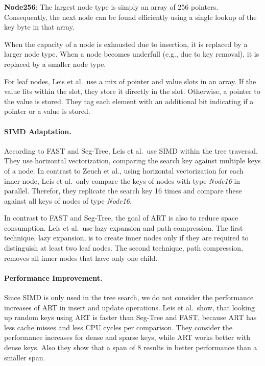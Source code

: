 \documentclass[runningheads,a4paper]{llncs}
\begin{document}
\textbf{Node256}: The largest node type is simply an array of 256 pointers. Consequently, the next node can be found efficiently using a single lookup of the key byte in that array. 

\noindent When the capacity of a node is exhausted due to insertion, it is replaced by a larger node type. When a node becomes underfull (e.g., due to key removal), it is replaced by a smaller node type.

For leaf nodes, Leis et al.\ use a mix of pointer and value slots in an array. If the value fits within the slot, they store it directly in the slot. Otherwise, a pointer to the value is stored. They tag each element with an additional bit indicating if a pointer or a value is stored.


\paragraph{SIMD Adaptation.}
According to FAST and Seg-Tree, Leis et al.\ use SIMD within the tree traversal. They use horizontal vectorization, comparing the search key against multiple keys of a node. In contrast to Zeuch et al., using horizontal vectorization for each inner node, Leis et al.\ only compare the keys of nodes with type \emph{Node16} in parallel. Therefor, they replicate the search key 16 times and compare these against all keys of nodes of type \emph{Node16}.

In contrast to FAST and Seg-Tree, the goal of ART is also to reduce space consumption. Leis et al.\ use lazy expansion and path compression. The first technique, lazy expansion, is to create inner nodes only if they are required to distinguish at least two leaf nodes. The second technique, path compression, removes all inner nodes that have only one child.


\paragraph{Performance Improvement.}
Since SIMD is only used in the tree search, we do not consider the performance increases of ART in insert and update operations. Leis et al.\ show, that looking up random keys using ART is faster than Seg-Tree and FAST, because ART has less cache misses and less CPU cycles per comparison. They consider the performance increases for dense and sparse keys, while ART works better with dense keys. Also they show that a span of 8 results in better performance than a smaller span. 
\end{document}
